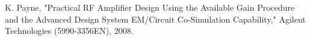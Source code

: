 \documentclass[conference]{IEEEtran}
\begin{document}

\begin{thebibliography}{1}
K. Payne, "Practical RF Amplifier Design Using the Available Gain Procedure and the Advanced Design System EM/Circuit Co-Simulation Capability," Agilent Technologies (5990-3356EN), 2008.
\end{thebibliography}
\end{document}
